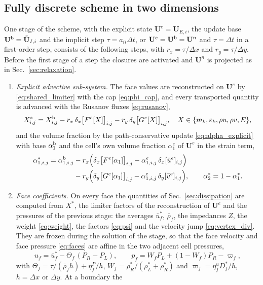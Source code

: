 \subsection{Fully discrete scheme in two dimensions}
\label{sec:fully}
One stage of the scheme, with the explicit state $\mathbf U^e=\mathbf U_{E,i}$, the update base $\mathbf U^{\rm b}=\tilde{\mathbf U}_{I,i}$ and the implicit step
$\tau=a_{ii}\Delta t$, or $\mathbf U^e=\mathbf U^{\rm b}=\mathbf U^n$ and $\tau=\Delta t$ in a first-order step, consists of the following steps, with $r_x=\tau/\Delta x$
and $r_y=\tau/\Delta y$. Before the first stage of a step the closures are activated and $\mathbf U^n$ is projected as in
Sec.~\ref{sec:relaxation}.
\begin{enumerate}
\item \emph{Explicit advective sub-system.} The face values are reconstructed on $\mathbf U^e$ by \eqref{eq:shared_limiter} with the cap \eqref{eq:phi_cap}, and every
transported quantity is advanced with the Rusanov fluxes \eqref{eq:rusanov},
\[
X^*_{i,j}=X^{\rm b}_{i,j}-r_x\,\delta_x\big[F^e[X]\big]_{i,j}-r_y\,\delta_y\big[G^e[X]\big]_{i,j},\quad
X\in\{m_k,\varepsilon_k,\rho u,\rho v,E\},
\]
and the volume fraction by the path-conservative update
\eqref{eq:alpha_explicit} with base $\alpha^{\rm b}_1$ and the cell's own volume fraction $\alpha^e_1$ of $\mathbf U^e$ in the strain term,
\[
\begin{aligned}
\alpha^*_{1,i,j}=\alpha^{\rm b}_{1,i,j}&-r_x\Big(\delta_x\big[F^e[\alpha_1]\big]_{i,j}-\alpha^e_{1,i,j}\,\delta_x[\bar u^e]_{i,j}\Big)\\
&-r_y\Big(\delta_y\big[G^e[\alpha_1]\big]_{i,j}-\alpha^e_{1,i,j}\,\delta_y[\bar v^e]_{i,j}\Big),\qquad \alpha^*_2=1-\alpha^*_1 .
\end{aligned}
\]
\item \emph{Face coefficients.} On every face the quantities of Sec.~\ref{sec:dissipation} are computed from $X^*$, the
limiter factors of the reconstruction of $\mathbf U^e$ and the pressures of the previous stage: the averages $\bar u^*_f$, $\bar\rho_f$, the impedances $Z$, the weight \eqref{eq:weight},
the factors \eqref{eq:psi} and the velocity jump \eqref{eq:vertex_div}. They are frozen during the solution of the stage,
so that the face velocity and face pressure \eqref{eq:faces} are affine in the two adjacent cell pressures,
\[
u_f=\bar u^*_f-\Theta_f\,(P_R-P_L),\qquad p_f=W_fP_L+(1-W_f)P_R-\varpi_f ,
\]
with $\Theta_f=\tau/(\bar\rho_f h)+\eta^P_f/h$, $W_f=\rho^*_R/(\rho^*_L+\rho^*_R)$ and $\varpi_f=\eta^u_fD^*_f/h$, $h=\Delta x$ or $\Delta y$. At a boundary the

\end{enumerate}
